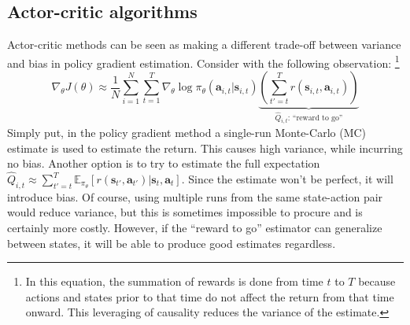 \subsection{Actor-critic algorithms}
\label{sub-ac-algs}
Actor-critic methods can be seen as making a different trade-off between 
variance and bias in policy gradient estimation.
Consider with the following observation:
\footnote{In this equation, the summation of rewards is done from time $t   $
		to $ T  $ because actions and states prior to that time do
		not affect the return from that time onward.
This leveraging of causality reduces the variance of the estimate.}
\begin{equation}
		\nabla_\theta J(\theta) \approx 
		\frac{1}{N} \sum_{i=1}^{N} \sum_{t=1}^{T} \nabla_\theta \log \pi_\theta (\bm{a}_{i,t}| \bm{s}_{i,t})
		\underbrace{\left ( \sum_{t'=t}^{T} r (\bm{s}_{i,t}, \bm{a}_{i,t}) \right )}_{\hat{Q}_{i,t}
		\text{: ``reward to go''}}
\end{equation}
Simply put, in the policy gradient method a single-run Monte-Carlo (MC) estimate is used
to estimate the return.
This causes high variance, while incurring no bias.
Another option is to try to estimate the full expectation
$ \hat{Q}_{i,t} \approx  \sum_{t'=t}^{T} \mathbb{E}_{\pi_\theta} \left[ r(\bm{s}_{t'}, \bm{a}_{t'}) |\bm{s}_{t}, \bm{a}_{t}  \right]     $.
Since the estimate won't be perfect, it will introduce bias.
Of course, using multiple runs from the same state-action pair would 
reduce variance, but this is sometimes impossible to procure
and is certainly more costly.
However, if the ``reward to go'' estimator can generalize between states,
it will be able to produce good estimates regardless.

